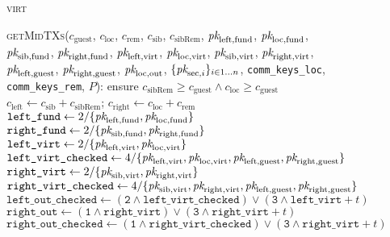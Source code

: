 \begin{figure}[H]
  \begin{processbox}{\textsc{virt}}
    \begin{algorithmic}[1]
      \State \textsc{getMidTXs}($c_{\mathrm{guest}}$, $c_{\mathrm{loc}}$,
      $c_{\mathrm{rem}}$, $c_{\mathrm{sib}}$, $c_{\mathrm{sibRem}}$,
      $\textit{pk}_{\mathrm{left}, \mathrm{fund}}$, $\textit{pk}_{\mathrm{loc}, \mathrm{fund}}$,
      $\textit{pk}_{\mathrm{sib}, \mathrm{fund}}$, $\textit{pk}_{\mathrm{right}, \mathrm{fund}}$,
      $\textit{pk}_{\mathrm{left}, \mathrm{virt}}$, $\textit{pk}_{\mathrm{loc}, \mathrm{virt}}$,
      $\textit{pk}_{\mathrm{sib}, \mathrm{virt}}$, $\textit{pk}_{\mathrm{right}, \mathrm{virt}}$,
      $\textit{pk}_{\mathrm{left}, \mathrm{guest}}$, $\textit{pk}_{\mathrm{right},
      \mathrm{guest}}$, $\textit{pk}_{\mathrm{loc}, \mathrm{out}}$, $\{\textit{pk}_{\mathrm{sec},
      i}\}_{i \in 1 \dots n}$, \texttt{comm\_keys\_loc},
      \texttt{comm\_keys\_rem}, $P$):
      \Indent
        \State ensure $c_{\mathrm{sibRem}} \geq c_{\mathrm{guest}} \wedge
        c_{\mathrm{loc}} \geq c_{\mathrm{guest}}$
        \State $c_{\mathrm{left}} \gets c_{\mathrm{sib}} + c_{\mathrm{sibRem}}$;
        $c_{\mathrm{right}} \gets c_{\mathrm{loc}} + c_{\mathrm{rem}}$
        \State $\texttt{left\_fund} \gets 2/\{\textit{pk}_{\mathrm{left}, \mathrm{fund}},
        \textit{pk}_{\mathrm{loc}, \mathrm{fund}}\}$
        \State $\texttt{right\_fund} \gets 2/\{\textit{pk}_{\mathrm{sib}, \mathrm{fund}},
        \textit{pk}_{\mathrm{right}, \mathrm{fund}}\}$
        \State $\texttt{left\_virt} \gets 2/\{\textit{pk}_{\mathrm{left}, \mathrm{virt}},
        \textit{pk}_{\mathrm{loc}, \mathrm{virt}}\}$
        \State $\texttt{left\_virt\_checked} \gets 4/\{\textit{pk}_{\mathrm{left},
        \mathrm{virt}}, \textit{pk}_{\mathrm{loc}, \mathrm{virt}}, \textit{pk}_{\mathrm{left},
        \mathrm{guest}}, \textit{pk}_{\mathrm{right}, \mathrm{guest}}\}$
        \State $\texttt{right\_virt} \gets 2/\{\textit{pk}_{\mathrm{sib}, \mathrm{virt}},
        \textit{pk}_{\mathrm{right}, \mathrm{virt}}\}$
        \State $\texttt{right\_virt\_checked} \gets 4/\{\textit{pk}_{\mathrm{sib},
        \mathrm{virt}}, \textit{pk}_{\mathrm{right}, \mathrm{virt}}, \textit{pk}_{\mathrm{left},
        \mathrm{guest}}, \textit{pk}_{\mathrm{right}, \mathrm{guest}}\}$
        \State $\texttt{left\_out\_checked} \gets (\texttt{2} \wedge
        \texttt{left\_virt\_checked}) \vee (\texttt{3} \wedge
        \texttt{left\_virt} + t)$
        \State $\texttt{right\_out} \gets (\texttt{1} \wedge
        \texttt{right\_virt}) \vee (\texttt{3} \wedge \texttt{right\_virt} + t)$
        \State $\texttt{right\_out\_checked} \gets (\texttt{1} \wedge
        \texttt{right\_virt\_checked}) \vee (\texttt{3} \wedge
        \texttt{right\_virt} + t)$

\end{algorithmic}
\end{processbox}
\end{figure}
